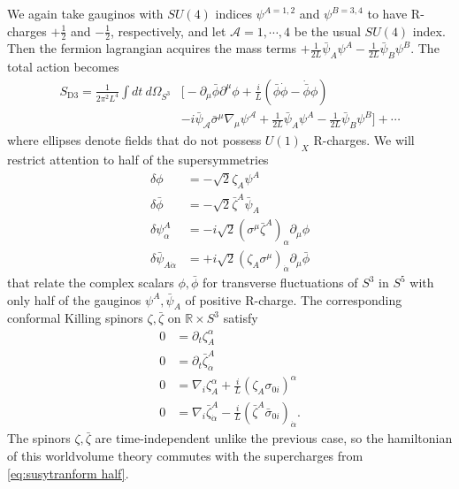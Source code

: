 \documentclass[a4paper,12pt]{article}
\begin{document}
We again take gauginos with $SU(4)$ indices $\psi^{A=1,2}$ and $\psi^{B=3,4}$ to have R-charges $+\frac{1}{2}$ and $-\frac{1}{2}$, respectively, and let $\mathcal{A}=1,\cdots,4$ be the usual $SU(4)$ index.  Then the fermion lagrangian acquires the mass terms
$+\frac{1}{2L} \bar\psi_A \psi^A - \frac{1}{2L} \bar\psi_B \psi^B$. The total action becomes
\begin{align} \label{eq:D3 action nonrotating}
    S_{\mathrm{D3}} = \frac{1}{2 \pi^2 L^4} \int dt \ d\Omega_{S^3} &\bigg[ -\partial_\mu \bar\phi \partial^\mu \phi + \frac{i}{L} ( \bar{\phi} \dot{\phi} - \dot{\bar{\phi}} \phi ) \nonumber \\
    &-i \bar\psi_{\mathcal{A}} \bar\sigma^\mu \nabla_\mu \psi^{\mathcal{A}} + \frac{1}{2L} \bar\psi_A \psi^A - \frac{1}{2L} \bar\psi_B \psi^B  \bigg] + \cdots 
\end{align}
where ellipses denote fields that do not possess $U(1)_X$ R-charges. We will restrict attention to half of the supersymmetries
\begin{align} \label{eq:susytranform half}
    \delta \phi &= -\sqrt{2} \zeta_A \psi^A \nonumber \\
    \delta \bar{\phi} &= -\sqrt{2} \bar\zeta^A \bar\psi_A \nonumber \\
    \delta \psi^A_\alpha &= - i \sqrt{2} (\sigma^\mu \bar{\zeta}^A)_{\alpha} \partial_\mu \phi \nonumber \\
    \delta \bar{\psi}_{A \dot\alpha} &= + i \sqrt{2} (\zeta_A \sigma^\mu)_{\dot\alpha} \partial_\mu \bar\phi
\end{align}
that relate the complex scalars $\phi,\bar\phi$ for transverse fluctuations of $S^3$ in $S^5$ with only half of the gauginos $\psi^{A}, \bar\psi_{A}$ of positive R-charge. The corresponding conformal Killing spinors $\zeta,\bar\zeta$ on $\mathbb{R} \times S^3$ satisfy \cite{Festuccia:2011ws}
\begin{align}
    0 &= \partial_t \zeta_A^\alpha \nonumber \\
    0 &= \partial_t \bar\zeta^A_{\dot\alpha} \nonumber \\
    0 &= \nabla_i \zeta_A^\alpha + \frac{i}{L} (\zeta_A \sigma_{0i})^\alpha \nonumber \\
    0 &= \nabla_i \bar\zeta^A_{\dot\alpha} - \frac{i}{L} (\bar\zeta^A \bar\sigma_{0i})_{\dot\alpha}.
\end{align}
The spinors $\zeta,\bar\zeta$ are time-independent unlike the previous case, so the hamiltonian of this worldvolume theory commutes with the supercharges from \eqref{eq:susytranform half}.
\end{document}
